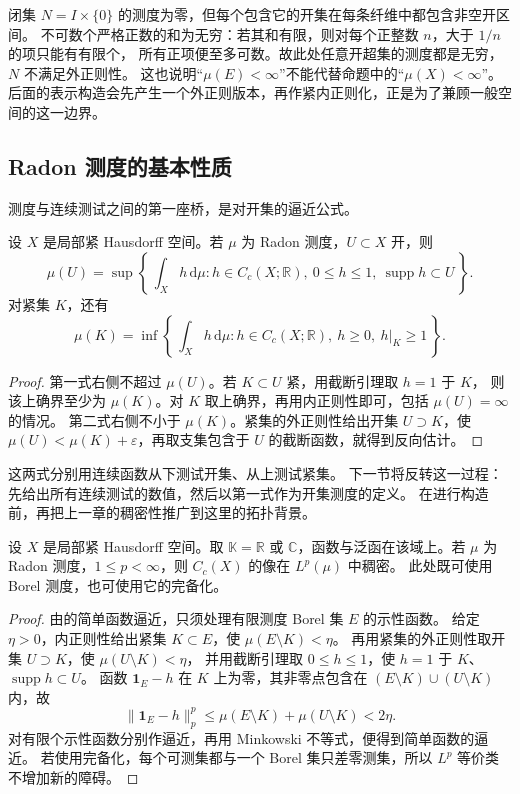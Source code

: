 \ProseParagraphBreak

闭集 \(N=I\times\{0\}\) 的测度为零，但每个包含它的开集在每条纤维中都包含非空开区间。
不可数个严格正数的和为无穷：若其和有限，则对每个正整数 \(n\)，大于 \(1/n\) 的项只能有有限个，
所有正项便至多可数。故此处任意开超集的测度都是无穷，\(N\) 不满足外正则性。
这也说明“\(\mu(E)<\infty\)”不能代替命题中的“\(\mu(X)<\infty\)”。
后面的表示构造会先产生一个外正则版本，再作紧内正则化，正是为了兼顾一般空间的这一边界。

\subsection{Radon 测度的基本性质}
\label{b1:subsec:110204}

测度与连续测试之间的第一座桥，是对开集的逼近公式。

\begin{proposition}\label{b1:prop:radon-open-test}
设 \(X\) 是局部紧 Hausdorff 空间。若 \(\mu\) 为 Radon 测度，\(U\subset X\) 开，则
\[
 \mu(U)=\sup\left\{\,\int_X h\,\mathrm d\mu:
 h\in C_c(X;\mathbb R),\ 0\leq h\leq1,\ \operatorname{supp}h\subset U\,\right\}.
\]
对紧集 \(K\)，还有
\[
 \mu(K)=\inf\left\{\,\int_X h\,\mathrm d\mu:
 h\in C_c(X;\mathbb R),\ h\geq0,\ h|_K\geq1\,\right\}.
\]
\end{proposition}
\begin{proof}
第一式右侧不超过 \(\mu(U)\)。若 \(K\subset U\) 紧，用截断引理取 \(h=1\) 于 \(K\)，
则该上确界至少为 \(\mu(K)\)。对 \(K\) 取上确界，再用内正则性即可，包括 \(\mu(U)=\infty\) 的情况。
第二式右侧不小于 \(\mu(K)\)。紧集的外正则性给出开集 \(U\supset K\)，使
\(\mu(U)<\mu(K)+\varepsilon\)，再取支集包含于 \(U\) 的截断函数，就得到反向估计。
\end{proof}

这两式分别用连续函数从下测试开集、从上测试紧集。
下一节将反转这一过程：先给出所有连续测试的数值，然后以第一式作为开集测度的定义。
在进行构造前，再把上一章的稠密性推广到这里的拓扑背景。

\begin{proposition}\label{b1:prop:radon-cc-dense-lp}
设 \(X\) 是局部紧 Hausdorff 空间。取 \(\mathbb K=\mathbb R\) 或 \(\mathbb C\)，函数与泛函在该域上。若 \(\mu\) 为 Radon 测度，\(1\leq p<\infty\)，则 \(C_c(X)\) 的像在 \(L^p(\mu)\) 中稠密。
此处既可使用 Borel 测度，也可使用它的完备化。
\end{proposition}
\begin{proof}
由的简单函数逼近，只须处理有限测度 Borel 集 \(E\) 的示性函数。
给定 \(\eta>0\)，内正则性给出紧集 \(K\subset E\)，使 \(\mu(E\setminus K)<\eta\)。
再用紧集的外正则性取开集 \(U\supset K\)，使 \(\mu(U\setminus K)<\eta\)，
并用截断引理取 \(0\leq h\leq1\)，使 \(h=1\) 于 \(K\)、\(\operatorname{supp}h\subset U\)。
函数 \(\mathbf1_E-h\) 在 \(K\) 上为零，其非零点包含在
\((E\setminus K)\cup(U\setminus K)\) 内，故
\[
 \|\mathbf1_E-h\|_p^p\leq\mu(E\setminus K)+\mu(U\setminus K)<2\eta.
\]
对有限个示性函数分别作逼近，再用 Minkowski 不等式，便得到简单函数的逼近。
若使用完备化，每个可测集都与一个 Borel 集只差零测集，所以 \(L^p\) 等价类不增加新的障碍。
\end{proof}

